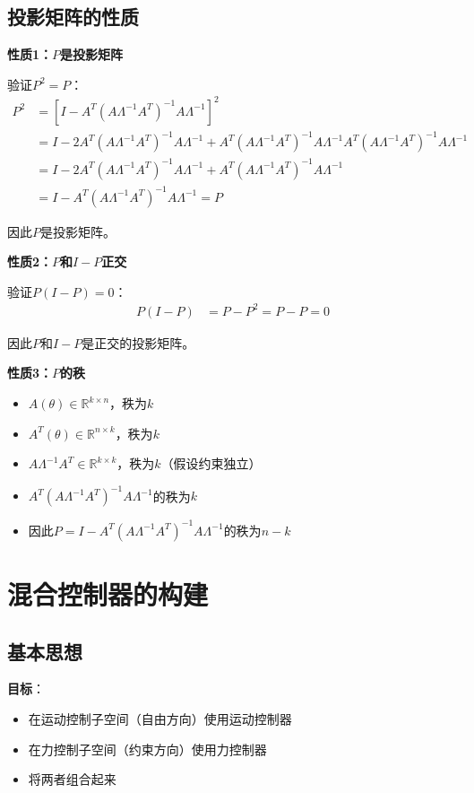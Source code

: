 \documentclass[12pt,a4paper]{article}
\begin{document}
\subsection{投影矩阵的性质}

\textbf{性质1：$P$是投影矩阵}

验证$P^2 = P$：
\begin{align}
P^2 &= [I - A^T(A\Lambda^{-1}A^T)^{-1}A\Lambda^{-1}]^2 \\
    &= I - 2A^T(A\Lambda^{-1}A^T)^{-1}A\Lambda^{-1} + A^T(A\Lambda^{-1}A^T)^{-1}A\Lambda^{-1}A^T(A\Lambda^{-1}A^T)^{-1}A\Lambda^{-1} \\
    &= I - 2A^T(A\Lambda^{-1}A^T)^{-1}A\Lambda^{-1} + A^T(A\Lambda^{-1}A^T)^{-1}A\Lambda^{-1} \\
    &= I - A^T(A\Lambda^{-1}A^T)^{-1}A\Lambda^{-1} = P
\end{align}

因此$P$是投影矩阵。

\textbf{性质2：$P$和$I-P$正交}

验证$P(I-P) = 0$：
\begin{align}
P(I-P) &= P - P^2 = P - P = 0
\end{align}

因此$P$和$I-P$是正交的投影矩阵。

\textbf{性质3：$P$的秩}

\begin{itemize}
\item $A(\theta) \in \mathbb{R}^{k \times n}$，秩为$k$
\item $A^T(\theta) \in \mathbb{R}^{n \times k}$，秩为$k$
\item $A\Lambda^{-1}A^T \in \mathbb{R}^{k \times k}$，秩为$k$（假设约束独立）
\item $A^T(A\Lambda^{-1}A^T)^{-1}A\Lambda^{-1}$的秩为$k$
\item 因此$P = I - A^T(A\Lambda^{-1}A^T)^{-1}A\Lambda^{-1}$的秩为$n-k$
\end{itemize}

\section{混合控制器的构建}

\subsection{基本思想}

\textbf{目标}：
\begin{itemize}
\item 在运动控制子空间（自由方向）使用运动控制器
\item 在力控制子空间（约束方向）使用力控制器
\item 将两者组合起来
\end{itemize}
\end{document}
